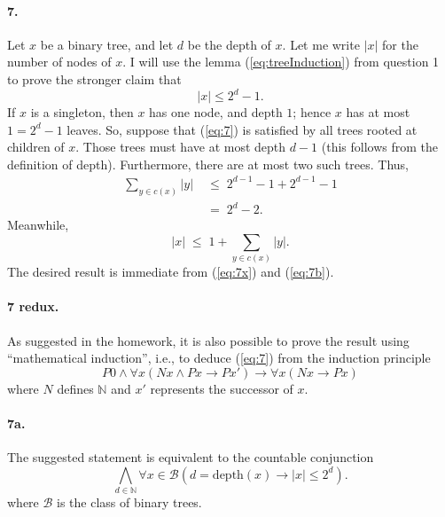 \documentclass[
]{article}
\begin{document}
\paragraph{7.} Let $x$ be a binary tree, and let $d$ be the depth of $x$.  Let me write $|x|$ for the number of nodes of $x$.  I will use the lemma (\ref{eq:treeInduction}) from question 1 to prove the stronger claim that 
\begin{equation}
  \label{eq:7}
  |x|\leq 2^{d}-1.
\end{equation}
If $x$ is a singleton, then $x$ has one node, and depth $1$; hence $x$ has at most $1=2^d-1$ leaves.  So, suppose that (\ref{eq:7}) is satisfied by all trees rooted at children of $x$. Those trees must have at most depth $d-1$ (this follows from the definition of depth).  Furthermore, there are at most two such trees.
Thus,
\begin{align}
  \label{eq:7x}
\nonumber
  \sum_{y\in c(x)}|y|
  \;&\leq \;
    2^{d-1} - 1 + 2^{d-1} - 1 \\ 
  \;&=\;
    2^d-2.
\end{align}
Meanwhile,
\begin{equation}
  \label{eq:7b}
|x| \;\leq \;
  1 + \sum_{y\in c(x)}|y|.
\end{equation}
The desired result is immediate from (\ref{eq:7x}) and (\ref{eq:7b}).


\paragraph{7 redux.} As suggested in the homework, it is also possible to prove the result using ``mathematical induction'', i.e., to deduce (\ref{eq:7}) from the induction principle
\begin{equation}
  \label{eq:numInduction}
  P0 \land \forall x(Nx \land Px\to Px')\to \forall x(Nx\to Px)
\end{equation}
where $N$ defines $\mathbb N$ and $x'$ represents the successor of $x$.

\paragraph{7a.} The suggested statement is equivalent to the countable conjunction
\begin{equation}
  \label{eq:7a}
  \bigwedge_{d\in \mathbb N} \forall x\in \mathcal B(d=\text{depth}(x)\to |x|\leq 2^d).
\end{equation}
where $\mathcal B$ is the class of binary trees.
\end{document}
